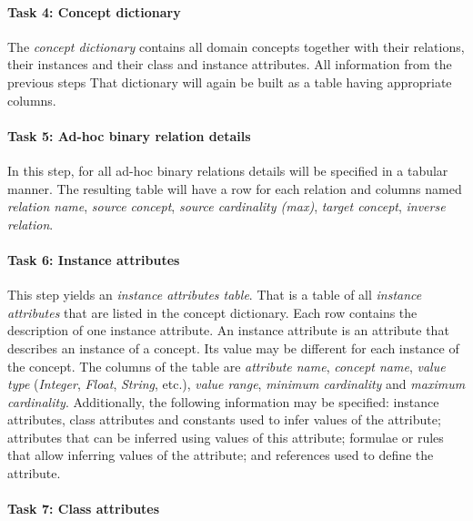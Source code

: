 
\paragraph{Task 4: Concept dictionary}

The \emph{concept dictionary} contains all domain concepts together with their relations, their instances and their class and instance attributes. All information from the previous steps That dictionary will again be built as a table having appropriate columns.


\paragraph{Task 5: Ad-hoc binary relation details}

In this step, for all ad-hoc binary relations details will be specified in a tabular manner. The resulting table will have a row for each relation and columns named \emph{relation name}, \emph{source concept}, \emph{source cardinality (max)}, \emph{target concept}, \emph{inverse relation}.


\paragraph{Task 6: Instance attributes}

This step yields an \emph{instance attributes table}. That is a table of all \emph{instance attributes} that are listed in the concept dictionary. Each row contains the description of one instance attribute. An instance attribute is an attribute that describes an instance of a concept. Its value may be different for each instance of the concept. The columns of the table are \emph{attribute name}, \emph{concept name}, \emph{value type} (\emph{Integer}, \emph{Float}, \emph{String}, etc.), \emph{value range}, \emph{minimum cardinality} and \emph{maximum cardinality}. Additionally, the following information may be specified: instance attributes, class attributes and constants used to infer values of the attribute; attributes that can be inferred using values of this attribute; formulae or rules that allow inferring values of the attribute; and references used to define the attribute.

\paragraph{Task 7: Class attributes}

